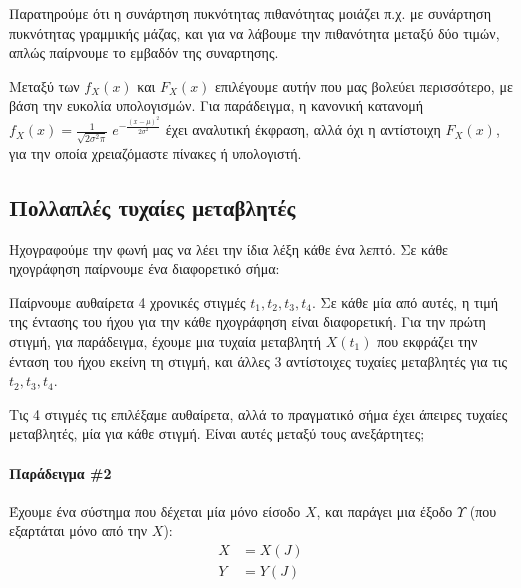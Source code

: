 \documentclass[11pt,a4paper,notitlepage,fleqn,draft]{article}
\begin{document}
	Παρατηρούμε ότι η συνάρτηση πυκνότητας πιθανότητας μοιάζει π.χ. με
	συνάρτηση πυκνότητας γραμμικής μάζας, και για να λάβουμε την
	πιθανότητα μεταξύ δύο τιμών, απλώς παίρνουμε το εμβαδόν της
	συναρτησης.
	
	Μεταξύ των \( f_X(x) \) και \( F_X(x) \) επιλέγουμε αυτήν που μας
	βολεύει περισσότερο, με βάση την ευκολία υπολογισμών. Για
	παράδειγμα, η κανονική κατανομή \( f_X(x) =
	\frac{1}{\sqrt{2\sigma^2\pi} } \; e^{ -\frac{(x-\mu)^2}{2\sigma^2} } 
	\) έχει αναλυτική έκφραση, αλλά όχι η αντίστοιχη \( F_X(x) \), για
	την οποία χρειαζόμαστε πίνακες ή υπολογιστή.
	
	\subsection{Πολλαπλές τυχαίες μεταβλητές}
	Ηχογραφούμε την φωνή μας να λέει την ίδια λέξη κάθε ένα λεπτό. Σε
	κάθε ηχογράφηση παίρνουμε ένα διαφορετικό σήμα:
	
	
	Παίρνουμε αυθαίρετα 4 χρονικές στιγμές \( t_1,t_2,t_3,t_4 \). Σε κάθε
	μία από αυτές, η τιμή της έντασης του ήχου για την κάθε ηχογράφηση
	είναι διαφορετική. Για την πρώτη στιγμή, για παράδειγμα, έχουμε μια
	τυχαία μεταβλητή \( X(t_1) \) που εκφράζει την ένταση του ήχου εκείνη
	τη στιγμή, και άλλες 3 αντίστοιχες τυχαίες μεταβλητές για τις \( 
	t_2,t_3,t_4 \).
	
	Τις 4 στιγμές τις επιλέξαμε αυθαίρετα, αλλά το πραγματικό σήμα έχει
	άπειρες τυχαίες μεταβλητές, μία για κάθε στιγμή. Είναι αυτές μεταξύ
	τους ανεξάρτητες;
	
	\paragraph{Παράδειγμα \#2}
	Έχουμε ένα σύστημα που δέχεται μία μόνο είσοδο \( X \), και παράγει
	μια έξοδο \( Υ \) (που εξαρτάται μόνο από την \( X \)):
	\begin{align*}
		X &= X(J) \\
		Y &= Y(J)
	\end{align*}
	
\end{document}
